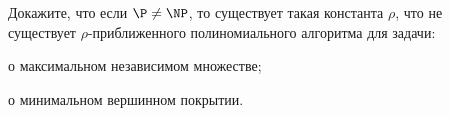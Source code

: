 Докажите, что если $\P \neq \NP$, то существует такая константа $\rho$, что не существует
$\rho$-приближенного полиномиального алгоритма для задачи:
\begin{enumcyr}
    \item о максимальном независимом множестве;
    \item о минимальном вершинном покрытии.
\end{enumcyr}